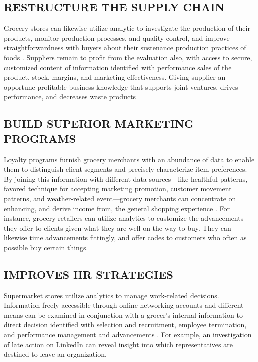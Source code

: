 \documentclass[sigconf]{acmart}
\begin{document}
\subsection{RESTRUCTURE THE SUPPLY CHAIN}

Grocery stores can likewise utilize analytic to investigate the production of their products, monitor production processes, and quality control, and improve straightforwardness with buyers about their sustenance production practices of foods \cite{11}. Suppliers remain to profit from the evaluation also, with access to secure, customized content of information identified with performance sales of the product, stock, margins, and marketing effectiveness. Giving supplier an opportune profitable business knowledge that supports joint ventures, drives performance, and decreases waste products

\subsection{BUILD SUPERIOR MARKETING PROGRAMS}

Loyalty programs furnish grocery merchants with an abundance of data to enable them to distinguish client segments and precisely characterize item preferences. By joining this information with different data sources—like healthful patterns, favored technique for accepting marketing promotion, customer movement patterns, and weather-related event—grocery merchants can concentrate on enhancing, and derive income from, the general shopping experience \cite{12}. For instance, grocery retailers can utilize analytics to customize the advancements they offer to clients given what they are well on the way to buy. They can likewise time advancements fittingly, and offer codes to customers who often as possible buy certain things. 

\subsection{IMPROVES HR STRATEGIES}

Supermarket stores utilize analytics to manage work-related decisions. Information freely accessible through online networking accounts and different means can be examined in conjunction with a grocer's internal information to direct decision identified with selection and recruitment, employee termination, and performance management and advancements \cite{13}. For example, an investigation of late action on LinkedIn can reveal insight into which representatives are destined to leave an organization. \\
\end{document}
